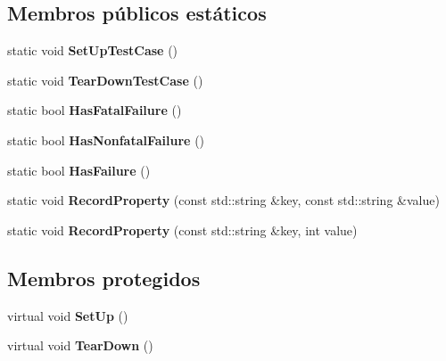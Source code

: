 \subsection*{Membros públicos estáticos}
\begin{DoxyCompactItemize}
\item 
\hypertarget{classtesting_1_1Test_a5ccbac42fee8c5b00b0bfe89b6c49d79}{static void {\bfseries Set\-Up\-Test\-Case} ()}\label{classtesting_1_1Test_a5ccbac42fee8c5b00b0bfe89b6c49d79}

\item 
\hypertarget{classtesting_1_1Test_af374706cbaf0ffc460f4fd04e7c150f1}{static void {\bfseries Tear\-Down\-Test\-Case} ()}\label{classtesting_1_1Test_af374706cbaf0ffc460f4fd04e7c150f1}

\item 
\hypertarget{classtesting_1_1Test_aa8d0725cfb519f82eaf4fd2d2f46d97d}{static bool {\bfseries Has\-Fatal\-Failure} ()}\label{classtesting_1_1Test_aa8d0725cfb519f82eaf4fd2d2f46d97d}

\item 
\hypertarget{classtesting_1_1Test_a3b933cea62eff67a05e23aa07f38bf29}{static bool {\bfseries Has\-Nonfatal\-Failure} ()}\label{classtesting_1_1Test_a3b933cea62eff67a05e23aa07f38bf29}

\item 
\hypertarget{classtesting_1_1Test_a7a00be7dd0a6bfdc8d47a1b784623613}{static bool {\bfseries Has\-Failure} ()}\label{classtesting_1_1Test_a7a00be7dd0a6bfdc8d47a1b784623613}

\item 
\hypertarget{classtesting_1_1Test_a7b20a48c0bbc9dd1fe96715e4a5c0164}{static void {\bfseries Record\-Property} (const std\-::string \&key, const std\-::string \&value)}\label{classtesting_1_1Test_a7b20a48c0bbc9dd1fe96715e4a5c0164}

\item 
\hypertarget{classtesting_1_1Test_afb8d29af28e48dc65b2b743f1874ccfe}{static void {\bfseries Record\-Property} (const std\-::string \&key, int value)}\label{classtesting_1_1Test_afb8d29af28e48dc65b2b743f1874ccfe}

\end{DoxyCompactItemize}
\subsection*{Membros protegidos}
\begin{DoxyCompactItemize}
\item 
\hypertarget{classtesting_1_1Test_a57a4116f39f6636a80710ded7d42e889}{virtual void {\bfseries Set\-Up} ()}\label{classtesting_1_1Test_a57a4116f39f6636a80710ded7d42e889}

\item 
\hypertarget{classtesting_1_1Test_a2889fd829b6c712d98fb3896d28f64a3}{virtual void {\bfseries Tear\-Down} ()}\label{classtesting_1_1Test_a2889fd829b6c712d98fb3896d28f64a3}

\end{DoxyCompactItemize}
